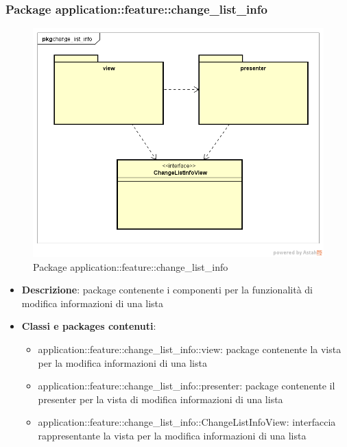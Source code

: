\subsubsection{Package application::feature::change\_list\_info}
\label{Package application::feature::change_list_info}
\begin{figure}[H]
	\centering
	\includegraphics[scale=0.5]{Sezioni/Packages/Application/change_list_info.png}
	\caption{Package application::feature::change\_list\_info}
\end{figure}
\begin{itemize}
	\item \textbf{Descrizione}: package contenente i componenti per la funzionalità di modifica informazioni di una lista
	\item \textbf{Classi e packages contenuti}:
	\begin{itemize}
	\item application::feature::change\_list\_info::view: package contenente la vista per la modifica informazioni di una lista
	\item application::feature::change\_list\_info::presenter: package contenente il presenter per la vista di modifica informazioni di una lista
	\item application::feature::change\_list\_info::ChangeListInfoView: interfaccia rappresentante la vista per la modifica informazioni di una lista
	\end{itemize}
\end{itemize}

